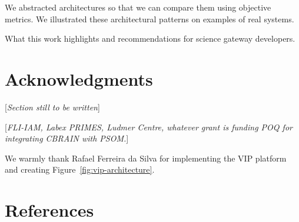 \documentclass[preprint,3p,twocolumn]{elsarticle}
\newcommand{\todo}[1]{\color{blue}\xspace[\emph{#1}]\xspace\color{black}}
\begin{document}
We abstracted architectures so that we can compare them using
objective metrics. We illustrated these architectural patterns on
examples of real systems.

What this work highlights and recommendations for science gateway
developers.

\section{Acknowledgments}

\todo{Section still to be written}

\todo{FLI-IAM, Labex PRIMES, Ludmer Centre, whatever grant is funding
  POQ for integrating CBRAIN with PSOM.}

We warmly thank Rafael Ferreira da Silva for implementing the VIP
platform and creating Figure~\ref{fig:vip-architecture}.

\section*{References}

 

\end{document}
